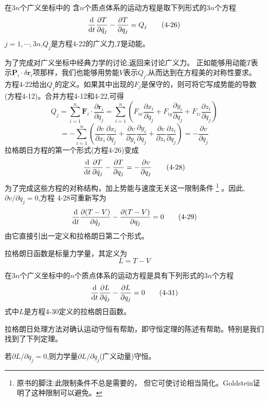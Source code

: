 \begin{theorem}[拉格朗日方程的第一个形式]
在$3n$个广义坐标中的
含$n$个质点体系的运动方程是取下列形式的$3n$个方程
\[\dv{t}\frac{\partial T}{\partial \dot{q}_j}-\frac{\partial T}{\partial q_j}=Q_j \tag{4-26}\]
$j=1, \cdots ,3n$,$Q_j$是方程4-22的广义力,$T$是动能。
\end{theorem}

为了完成对广义坐标中经典力学的讨论,返回来讨论广义力。
正如能够用动能$T$表示$\dot{\mathbf{P}}_i \cdot \delta \mathbf{r}_i$项那样，我们也能够用势能$V$表示$Q_j$,从而达到在方程美的对称性要求。
方程4-22给出$Q_j$的定义。如果其中出现的$F_j$是保守的，则可将它写成势能的导数(方程4-12)。合并方程4-12和4-22,可得
\[Q_j=\sum_{i=1}^n\mathbf{F}_i \cdot \frac{\partial \mathbf{r}_i}{\partial q_j}
=\sum_{i=1}^n\left(F_{ix}\frac{\partial x_i}{\partial q_j}+F_{iy}\frac{\partial y_i}{\partial q_j}+F_{iz}\frac{\partial z_i}{\partial q_j}\right)\]
\[=-\sum_{i=1}^n\left(\frac{\partial v}{\partial x_i}\frac{\partial x_i}{\partial q_j}+\frac{\partial v}{\partial y_i}\frac{\partial y_i}{\partial q_j}+\frac{\partial v}{\partial z_i}\frac{\partial z_i}{\partial q_j}\right)=-\frac{\partial v}{\partial q_j} \tag{4-27}\]
拉格朗日方程的第一个形式(方程4-26)变成
\[\dv{t}\frac{\partial T}{\partial \dot{q}_j}-\frac{\partial T}{\partial q_j}=-\frac{\partial v}{\partial q_j} \tag{4-28}\]
为了完成这些方程的对称结构，加上势能与速度无关这一限制条件
\footnote{原书的脚注:此限制条件不总是需要的， 但它可使讨论相当简化。Goldstein证明了这种限制可以避免。}
。因此,$\partial v/\partial \dot{q}_j=0$,方程 4-28可重新写为
\[\dv{t}\frac{\partial (T-V)}{\partial \dot{q}_j}-\frac{\partial (T-V)}{\partial q_j}=0 \tag{4-29}\]
由它直接引出一定义和拉格朗日第二个形式。

\begin{definition}[拉格朗日函数]
    拉格朗日函数是标量力学量，其定义为
    \[L=T-V \tag{4-30}\]
\end{definition}

\begin{theorem}[拉格朗日方程第二个形式]
    在$3n$个广义坐标中的$n$个质点体系的运动方程是具有下列形式的$3n$个方程
    \[\dv{t}\frac{\partial L}{\partial \dot{q}_j}-\frac{\partial L}{\partial q_j}=0 \tag{4-31}\]
    式中$L$是方程4-30定义的拉格朗日函数。
\end{theorem}

拉格朗日处理方法对确认运动守恒有帮助，即守恒定理的陈述有帮助。特别是我们找到了下列定理。
\begin{theorem}[广义守恒定理]
    若$\partial L/\partial q_j=0$,则力学量$\partial L/\partial \dot{q}_j$(广义动量)守恒。
\end{theorem}

